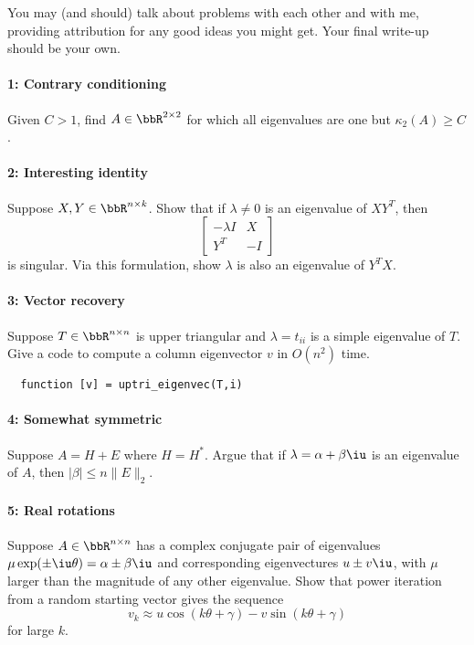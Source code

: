 \documentclass[12pt, leqno]{article} %
\begin{document}

You may (and should) talk about problems with each other and with me,
providing attribution for any good ideas you might get.  Your final
write-up should be your own.

\paragraph*{1: Contrary conditioning}
Given $C > 1$, find $A \in \bbR^{2 \times 2}$ for which all
eigenvalues are one but $\kappa_2(A) \geq C$.

\paragraph*{2: Interesting identity}
Suppose $X, Y \in \bbR^{n \times k}$.  Show that if $\lambda \neq 0$
is an eigenvalue of $XY^T$, then
\[
  \begin{bmatrix}
    -\lambda I & X \\
    Y^T & -I
  \end{bmatrix}
\]
is singular.  Via this formulation, show $\lambda$ is also an
eigenvalue of $Y^T X$.

\paragraph*{3: Vector recovery}
Suppose $T \in \bbR^{n \times n}$ is upper triangular and
$\lambda = t_{ii}$ is a simple eigenvalue of $T$.  Give a code
to compute a column eigenvector $v$ in $O(n^2)$ time.
\begin{lstlisting}
  function [v] = uptri_eigenvec(T,i)
\end{lstlisting}

\paragraph*{4: Somewhat symmetric}
Suppose $A = H + E$ where $H=H^*$.  Argue that if
$\lambda = \alpha+\beta \iu$ is an eigenvalue of $A$,
then $|\beta| \leq n \|E\|_2$.

\paragraph*{5: Real rotations}
Suppose $A \in \bbR^{n \times n}$ has a complex conjugate pair
of eigenvalues $\mu \exp(\pm \iu \theta) = \alpha \pm \beta \iu$
and corresponding eigenvectures $u \pm v\iu$,
with $\mu$ larger than the magnitude of any other eigenvalue.
Show that power iteration from a random starting vector gives the sequence
\[
  v_k \approx u \cos(k\theta + \gamma) - v \sin(k\theta + \gamma)
\]
for large $k$.
\end{document}
